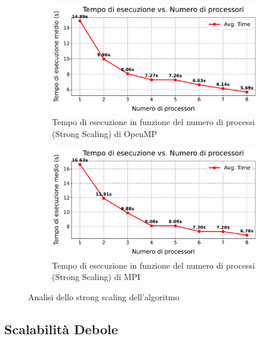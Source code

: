 \documentclass[letterpaper,11pt,leqno]{article}
\begin{document}
\begin{figure}[h]
    \centering
    \begin{subfigure}{0.48\textwidth} %
        \centering
        \includegraphics[scale=0.3]{graphs/omp_strong_scaling.pdf}
        \caption{Tempo di esecuzione in funzione del numero di processi (Strong Scaling) di OpenMP}
        \label{f:strong_scaling}
    \end{subfigure}
    \hfill %
    \begin{subfigure}{0.48\textwidth} %
        \centering
        \includegraphics[scale=0.3]{graphs/mpi_strong_scaling.pdf}
        \caption{Tempo di esecuzione in funzione del numero di processi (Strong Scaling) di MPI}
        \label{f:strong_scaling_speedup}
    \end{subfigure}
    \caption{Analisi dello strong scaling dell'algoritmo}
    \label{f:strong_scaling_graphs}
\end{figure}
  


\subsection{Scalabilità Debole}
\end{document}
